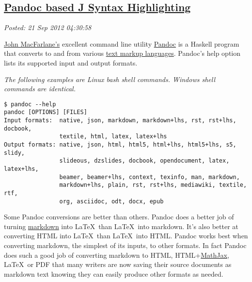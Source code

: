 %

\subsection*{\href{https://bakerjd99.wordpress.com/2012/09/20/pandoc-based-j-syntax-highlighting/}{Pandoc based J Syntax Highlighting}}

\noindent\emph{Posted: 21 Sep 2012 04:30:58}
\vspace{6pt}

\href{http://johnmacfarlane.net/}{John MacFarlane's} excellent command
line utility \href{http://johnmacfarlane.net/pandoc/}{Pandoc} is a Haskell program that converts to and from
various \href{http://en.wikipedia.org/wiki/Markup\_language}{text markup
languages}. Pandoc's help option lists its supported input and output
formats.

\emph{The following examples are Linux bash shell commands. Windows
shell commands are identical.}

\footnotesize
\begin{tcolorbox}[breakable, size=fbox, boxrule=1pt, pad at break*=1mm,colback=cellbackground, colframe=cellborder]
\begin{verbatim}
$ pandoc --help
pandoc [OPTIONS] [FILES]
Input formats:  native, json, markdown, markdown+lhs, rst, rst+lhs, docbook,
                textile, html, latex, latex+lhs
Output formats: native, json, html, html5, html+lhs, html5+lhs, s5, slidy,
                slideous, dzslides, docbook, opendocument, latex, latex+lhs,
                beamer, beamer+lhs, context, texinfo, man, markdown,
                markdown+lhs, plain, rst, rst+lhs, mediawiki, textile, rtf,
                org, asciidoc, odt, docx, epub
\end{verbatim}
\end{tcolorbox}
\normalsize

Some Pandoc conversions are better than others. Pandoc does a better
job of turning \href{http://daringfireball.net/projects/markdown/syntax}{markdown} into
\LaTeX\ than \LaTeX\ into markdown. It's also better at converting HTML into
\LaTeX\ than \LaTeX\ into HTML. Pandoc works best when converting markdown,
the simplest of its inputs, to other formats. In fact Pandoc does such a
good job of converting markdown to HTML,
HTML+\href{http://www.mathjax.org/}{MathJax}, \LaTeX\ or PDF that many
writers are now saving their source documents as markdown text knowing
they can easily produce other formats as needed.

